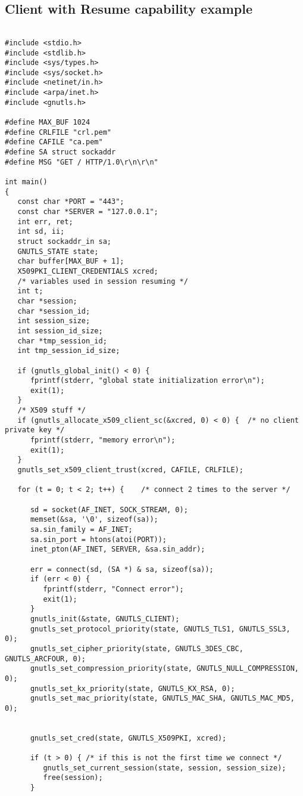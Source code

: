 \subsection{Client with Resume capability example}
\label{resume-example}
\begin{verbatim}

#include <stdio.h>
#include <stdlib.h>
#include <sys/types.h>
#include <sys/socket.h>
#include <netinet/in.h>
#include <arpa/inet.h>
#include <gnutls.h>

#define MAX_BUF 1024
#define CRLFILE "crl.pem"
#define CAFILE "ca.pem"
#define SA struct sockaddr
#define MSG "GET / HTTP/1.0\r\n\r\n"

int main()
{
   const char *PORT = "443";
   const char *SERVER = "127.0.0.1";
   int err, ret;
   int sd, ii;
   struct sockaddr_in sa;
   GNUTLS_STATE state;
   char buffer[MAX_BUF + 1];
   X509PKI_CLIENT_CREDENTIALS xcred;
   /* variables used in session resuming */
   int t;
   char *session;
   char *session_id;
   int session_size;
   int session_id_size;
   char *tmp_session_id;
   int tmp_session_id_size;

   if (gnutls_global_init() < 0) {
      fprintf(stderr, "global state initialization error\n");
      exit(1);
   }
   /* X509 stuff */
   if (gnutls_allocate_x509_client_sc(&xcred, 0) < 0) {  /* no client private key */
      fprintf(stderr, "memory error\n");
      exit(1);
   }
   gnutls_set_x509_client_trust(xcred, CAFILE, CRLFILE);

   for (t = 0; t < 2; t++) {    /* connect 2 times to the server */

      sd = socket(AF_INET, SOCK_STREAM, 0);
      memset(&sa, '\0', sizeof(sa));
      sa.sin_family = AF_INET;
      sa.sin_port = htons(atoi(PORT));
      inet_pton(AF_INET, SERVER, &sa.sin_addr);

      err = connect(sd, (SA *) & sa, sizeof(sa));
      if (err < 0) {
         fprintf(stderr, "Connect error");
         exit(1);
      }
      gnutls_init(&state, GNUTLS_CLIENT);
      gnutls_set_protocol_priority(state, GNUTLS_TLS1, GNUTLS_SSL3, 0);
      gnutls_set_cipher_priority(state, GNUTLS_3DES_CBC, GNUTLS_ARCFOUR, 0);
      gnutls_set_compression_priority(state, GNUTLS_NULL_COMPRESSION, 0);
      gnutls_set_kx_priority(state, GNUTLS_KX_RSA, 0);
      gnutls_set_mac_priority(state, GNUTLS_MAC_SHA, GNUTLS_MAC_MD5, 0);


      gnutls_set_cred(state, GNUTLS_X509PKI, xcred);

      if (t > 0) { /* if this is not the first time we connect */
         gnutls_set_current_session(state, session, session_size);
         free(session);
      }
      

\end{verbatim}

